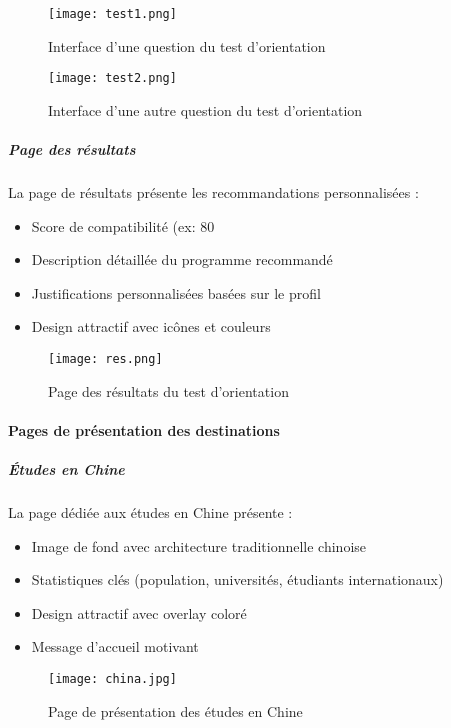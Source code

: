 \documentclass[12pt,a4paper]{report}
\begin{document}
\begin{figure}[H]
\centering
\texttt{[image: test1.png]}
\caption{Interface d'une question du test d'orientation}
\label{fig:test-question}
\end{figure}

\begin{figure}[H]
\centering
\texttt{[image: test2.png]}
\caption{Interface d'une autre question du test d'orientation}
\label{fig:test-question2}
\end{figure}

\subparagraph{Page des résultats}

La page de résultats présente les recommandations personnalisées :

\begin{itemize}
    \item Score de compatibilité (ex: 80%
    \item Description détaillée du programme recommandé
    \item Justifications personnalisées basées sur le profil
    \item Design attractif avec icônes et couleurs
\end{itemize}

\begin{figure}[H]
\centering
\texttt{[image: res.png]}
\caption{Page des résultats du test d'orientation}
\label{fig:resultat-test}
\end{figure}

\paragraph{Pages de présentation des destinations}

\subparagraph{Études en Chine}

La page dédiée aux études en Chine présente :

\begin{itemize}
    \item Image de fond avec architecture traditionnelle chinoise
    \item Statistiques clés (population, universités, étudiants internationaux)
    \item Design attractif avec overlay coloré
    \item Message d'accueil motivant
\end{itemize}

\begin{figure}[H]
\centering
\texttt{[image: china.jpg]}
\caption{Page de présentation des études en Chine}
\label{fig:china-page}
\end{figure}
\end{document}
